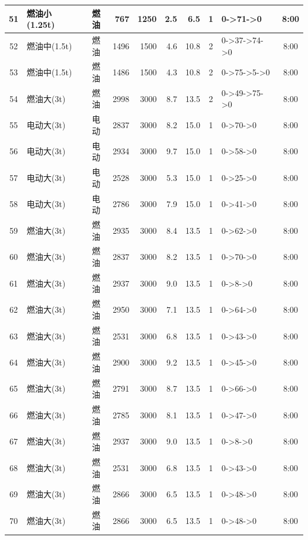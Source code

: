 \begin{landscape}
\begin{longtable}{|c|l|c|r|r|r|r|c|p{2.8cm}|c|}
\hline
\rowcolor{gray!8}
51 & 燃油小(1.25t) & 燃油 & 767 & 1250 & 2.5 & 6.5 & 1 & 0->71->0 & 8:00 \\
\hline
52 & 燃油中(1.5t) & 燃油 & 1496 & 1500 & 4.6 & 10.8 & 2 & 0->37->74->0 & 8:00 \\
\hline
\rowcolor{gray!8}
53 & 燃油中(1.5t) & 燃油 & 1486 & 1500 & 4.3 & 10.8 & 2 & 0->75->5->0 & 8:00 \\
\hline
54 & 燃油大(3t) & 燃油 & 2998 & 3000 & 8.7 & 13.5 & 2 & 0->49->75->0 & 8:00 \\
\hline
\rowcolor{gray!8}
55 & 电动大(3t) & 电动 & 2837 & 3000 & 8.2 & 15.0 & 1 & 0->70->0 & 8:00 \\
\hline
56 & 电动大(3t) & 电动 & 2934 & 3000 & 9.7 & 15.0 & 1 & 0->58->0 & 8:00 \\
\hline
\rowcolor{gray!8}
57 & 电动大(3t) & 电动 & 2528 & 3000 & 5.3 & 15.0 & 1 & 0->25->0 & 8:00 \\
\hline
58 & 电动大(3t) & 电动 & 2786 & 3000 & 7.9 & 15.0 & 1 & 0->41->0 & 8:00 \\
\hline
\rowcolor{gray!8}
59 & 燃油大(3t) & 燃油 & 2935 & 3000 & 8.4 & 13.5 & 1 & 0->62->0 & 8:00 \\
\hline
60 & 燃油大(3t) & 燃油 & 2837 & 3000 & 8.2 & 13.5 & 1 & 0->70->0 & 8:00 \\
\hline
\rowcolor{gray!8}
61 & 燃油大(3t) & 燃油 & 2937 & 3000 & 9.0 & 13.5 & 1 & 0->8->0 & 8:00 \\
\hline
62 & 燃油大(3t) & 燃油 & 2950 & 3000 & 7.1 & 13.5 & 1 & 0->64->0 & 8:00 \\
\hline
\rowcolor{gray!8}
63 & 燃油大(3t) & 燃油 & 2531 & 3000 & 6.8 & 13.5 & 1 & 0->43->0 & 8:00 \\
\hline
64 & 燃油大(3t) & 燃油 & 2900 & 3000 & 9.2 & 13.5 & 1 & 0->45->0 & 8:00 \\
\hline
\rowcolor{gray!8}
65 & 燃油大(3t) & 燃油 & 2791 & 3000 & 8.7 & 13.5 & 1 & 0->66->0 & 8:00 \\
\hline
66 & 燃油大(3t) & 燃油 & 2785 & 3000 & 8.1 & 13.5 & 1 & 0->47->0 & 8:00 \\
\hline
\rowcolor{gray!8}
67 & 燃油大(3t) & 燃油 & 2937 & 3000 & 9.0 & 13.5 & 1 & 0->8->0 & 8:00 \\
\hline
68 & 燃油大(3t) & 燃油 & 2531 & 3000 & 6.8 & 13.5 & 1 & 0->43->0 & 8:00 \\
\hline
\rowcolor{gray!8}
69 & 燃油大(3t) & 燃油 & 2866 & 3000 & 6.5 & 13.5 & 1 & 0->48->0 & 8:00 \\
\hline
70 & 燃油大(3t) & 燃油 & 2866 & 3000 & 6.5 & 13.5 & 1 & 0->48->0 & 8:00 \\

\end{longtable}
\end{landscape}
